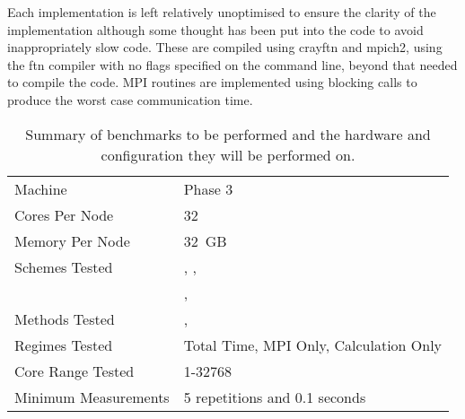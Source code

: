 Each implementation is left relatively unoptimised to ensure
the clarity of the implementation although
some thought has been put into the code to avoid inappropriately slow code.
%
These are compiled using crayftn and mpich2, using the ftn compiler with
no flags specified on the command line, beyond that needed to compile
the code.
%
MPI routines are implemented using blocking calls to produce the worst
case communication time.

\begin{table}
    \begin{tabular}{|l|l|}
        \hline
        Machine & \hector{} Phase 3 \\
        Cores Per Node & 32 \\
        Memory Per Node & 32~GB \\
        \hline
        Schemes Tested & \replicateddata{}, \systolicloop{}, \\
                       & \sharedandreplicateddata{},
                         \replicatedsystolicloop{} \\
        Methods Tested & \individualoperation{}, \pairoperation{} \\
        Regimes Tested & Total Time, MPI Only, Calculation Only \\
        Core Range Tested & 1-32768 \\
        Minimum Measurements & 5 repetitions and 0.1 seconds \\
        \hline
    \end{tabular}
    \caption{
        Summary of benchmarks to be performed and the hardware and
        configuration they will be performed on.
    }
    \label{table:benchmark_configuration}
\end{table}

